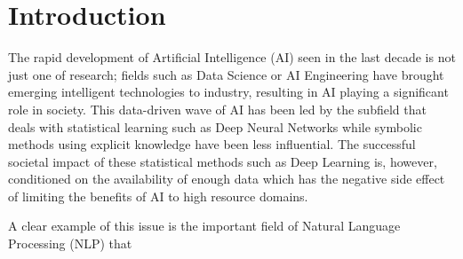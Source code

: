 \documentclass[main.tex]{subfiles}
\begin{document}
\chapter{Introduction}
The rapid development of Artificial Intelligence (AI) seen in the last decade is not just one of research;
fields such as Data Science or AI Engineering have brought emerging intelligent technologies to industry, resulting in AI playing a significant role in society.
This data-driven wave of AI has been led by the subfield that deals with statistical learning such as Deep Neural Networks while symbolic methods using explicit knowledge have been less influential.
The successful societal impact of these statistical methods such as Deep Learning is, however, conditioned on the availability of enough data which has the negative side effect of limiting the benefits of AI to high resource domains.

A clear example of this issue is the important field of Natural Language Processing (NLP) that
\end{document}
